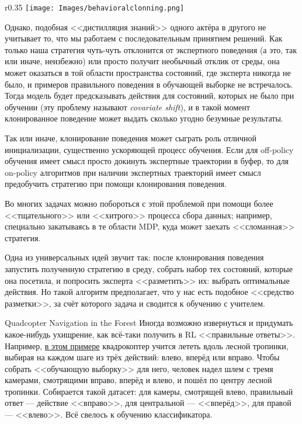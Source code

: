 \begin{wrapfigure}{r}{0.35\textwidth}
\vspace{-0.4cm}
\centering
\texttt{[image: Images/behavioralclonning.png]}
\vspace{-0.5cm}
\end{wrapfigure}

Однако, подобная <<дистилляция знаний>> одного актёра в другого не учитывает то, что мы работаем с последовательным принятием решений. Как только наша стратегия чуть-чуть отклонится от экспертного поведения (а это, так или иначе, неизбежно) или просто получит необычный отклик от среды, она может оказаться в той области пространства состояний, где эксперта никогда не было, и примеров правильного поведения в обучающей выборке не встречалось. Тогда модель будет предсказывать действия для состояний, которых не было при обучении (эту проблему называют \emph{covariate shift}), и в такой момент клонированное поведение может выдать сколько угодно безумные результаты.

\begin{remark}
Так или иначе, клонирование поведения может сыграть роль отличной инициализации, существенно ускоряющей процесс обучения. Если для off-policy обучения имеет смысл просто докинуть экспертные траектории в буфер, то для on-policy алгоритмов при наличии экспертных траекторий имеет смысл предобучить стратегию при помощи клонирования поведения. 
\end{remark}

Во многих задачах можно побороться с этой проблемой при помощи более <<тщательного>> или <<хитрого>> процесса сбора данных; например, специально закатываясь в те области MDP, куда может заехать <<сломанная>> стратегия.

\begin{example}[DAgger]
Одна из универсальных идей звучит так: после клонирования поведения запустить полученную стратегию в среду, собрать набор тех состояний, которые она посетила, и попросить эксперта <<разметить>> их: выбрать оптимальные действия. Но такой алгоритм предполагает, что у нас есть подобное <<средство разметки>>, за счёт которого задача и сводится к обучению с учителем.
\end{example}

\begin{exampleBox}[label=ex:quadrocopter]{Quadcopter Navigation in the Forest}
Иногда возможно извернуться и придумать какое-нибудь ухищрение, как всё-таки получить в RL <<правильные ответы>>. Например, \href{https://www.youtube.com/watch?v=umRdt3zGgpU&ab_channel=AAAIVideoCompetition}{в этом примере} квадрокоптер учится лететь вдоль лесной тропинки, выбирая на каждом шаге из трёх действий: влево, вперёд или вправо. Чтобы собрать <<обучающую выборку>> для него, человек надел шлем с тремя камерами, смотрящими вправо, вперёд и влево, и пошёл по центру лесной тропинки. Собирается такой датасет: для камеры, смотрящей влево, правильный ответ --- действие <<вправо>>, для центральной --- <<вперёд>>, для правой --- <<влево>>. Всё свелось к обучению классификатора.
\end{exampleBox}


